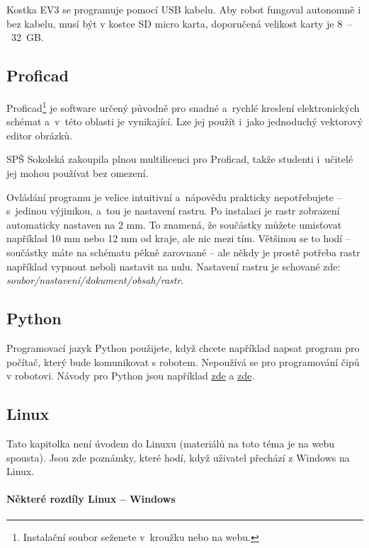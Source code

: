 Kostka EV3 se programuje pomocí USB kabelu. 
Aby robot fungoval autonomně i bez kabelu, musí být v kostce SD micro karta, doporučená velikost karty je 8~--~32~GB. 

\subsection{Proficad}

Proficad\footnote{Instalační soubor seženete v~kroužku nebo na webu.} 
je software určený původně pro snadné a~rychlé kreslení elektronických schémat a~v~této oblasti je vynikající. 
Lze jej použít i~jako jednoduchý vektorový editor obrázků. 

SPŠ Sokolská zakoupila plnou multilicenci pro Proficad, takže studenti i~učitelé jej mohou používat bez omezení. 

Ovládání programu je velice intuitivní a~nápovědu prakticky nepotřebujete -- s~jedinou výjimkou, a~tou je nastavení rastru. 
Po instalaci je rastr zobrazení automaticky nastaven na 2 mm. To znamená, že součástky 
můžete umisťovat například 10 mm nebo 12 mm od kraje, ale nic mezi tím. 
Většinou se to hodí -- součástky máte na schématu pěkně zarovnané -- ale 
někdy je prostě potřeba rastr například vypnout neboli nastavit na nulu. 
Nastavení rastru je schované zde:  {\it soubor/nastavení/dokument/obsah/rastr}.

\subsection{Python}

Programovací jazyk Python použijete, když chcete například napsat program pro počítač, který bude komunikovat s robotem. 
Nepoužívá se pro programování čipů v robotovi. 
Návody pro Python jsou například \href{https://www.sallyx.org/sally/python/}{zde} a  \href{http://diveintopython3.py.cz/index.html}{zde}. 


\subsection{Linux} 

Tato kapitolka není úvodem do Linuxu (materiálů na toto téma je na webu spousta).  Jsou zde poznámky, které hodí, když uživatel přechází z Windows na Linux. 

\paragraph{Některé rozdíly Linux -- Windows}


